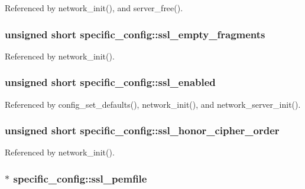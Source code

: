 Referenced by network\-\_\-init(), and server\-\_\-free().

\hypertarget{structspecific__config_a785e41f7c56e26b8d217e61113653c32}{
\subsubsection[{ssl\-\_\-empty\-\_\-fragments}]{\setlength{\rightskip}{0pt plus 5cm}unsigned short specific\-\_\-config\-::ssl\-\_\-empty\-\_\-fragments}}\label{structspecific__config_a785e41f7c56e26b8d217e61113653c32}


Referenced by network\-\_\-init().

\hypertarget{structspecific__config_a98bb430e5bdbd0eee2eaddb03cbfd1d0}{
\subsubsection[{ssl\-\_\-enabled}]{\setlength{\rightskip}{0pt plus 5cm}unsigned short specific\-\_\-config\-::ssl\-\_\-enabled}}\label{structspecific__config_a98bb430e5bdbd0eee2eaddb03cbfd1d0}


Referenced by config\-\_\-set\-\_\-defaults(), network\-\_\-init(), and network\-\_\-server\-\_\-init().

\hypertarget{structspecific__config_a9f682341f897cb76de7259fbfd5c8902}{
\subsubsection[{ssl\-\_\-honor\-\_\-cipher\-\_\-order}]{\setlength{\rightskip}{0pt plus 5cm}unsigned short specific\-\_\-config\-::ssl\-\_\-honor\-\_\-cipher\-\_\-order}}\label{structspecific__config_a9f682341f897cb76de7259fbfd5c8902}


Referenced by network\-\_\-init().

\hypertarget{structspecific__config_a9fb40263e5f01ad3f98472ffb24e8775}{
\subsubsection[{ssl\-\_\-pemfile}]{$\ast$ specific\-\_\-config\-::ssl\-\_\-pemfile}}\label{structspecific__config_a9fb40263e5f01ad3f98472ffb24e8775}


